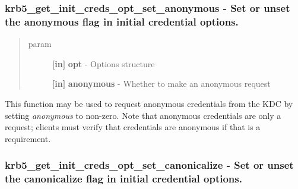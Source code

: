 \documentclass[letterpaper,10pt,english]{sphinxmanual}
\begin{document}
\subsubsection{krb5\_get\_init\_creds\_opt\_set\_anonymous -  Set or unset the anonymous flag in initial credential options.}
\label{appdev/refs/api/krb5_get_init_creds_opt_set_anonymous:krb5-get-init-creds-opt-set-anonymous-set-or-unset-the-anonymous-flag-in-initial-credential-options}\label{appdev/refs/api/krb5_get_init_creds_opt_set_anonymous::doc}

\begin{fulllineitems}
\label{appdev/refs/api/krb5_get_init_creds_opt_set_anonymous:c.krb5_get_init_creds_opt_set_anonymous}
\end{fulllineitems}

\begin{quote}\begin{description}
\item[{param}] \leavevmode
\textbf{{[}in{]}} \textbf{opt} - Options structure

\textbf{{[}in{]}} \textbf{anonymous} - Whether to make an anonymous request

\end{description}\end{quote}

This function may be used to request anonymous credentials from the KDC by setting \emph{anonymous} to non-zero. Note that anonymous credentials are only a request; clients must verify that credentials are anonymous if that is a requirement.


\subsubsection{krb5\_get\_init\_creds\_opt\_set\_canonicalize -  Set or unset the canonicalize flag in initial credential options.}
\label{appdev/refs/api/krb5_get_init_creds_opt_set_canonicalize:krb5-get-init-creds-opt-set-canonicalize-set-or-unset-the-canonicalize-flag-in-initial-credential-options}\label{appdev/refs/api/krb5_get_init_creds_opt_set_canonicalize::doc}

\begin{fulllineitems}
\label{appdev/refs/api/krb5_get_init_creds_opt_set_canonicalize:c.krb5_get_init_creds_opt_set_canonicalize}
\end{fulllineitems}
\end{document}
